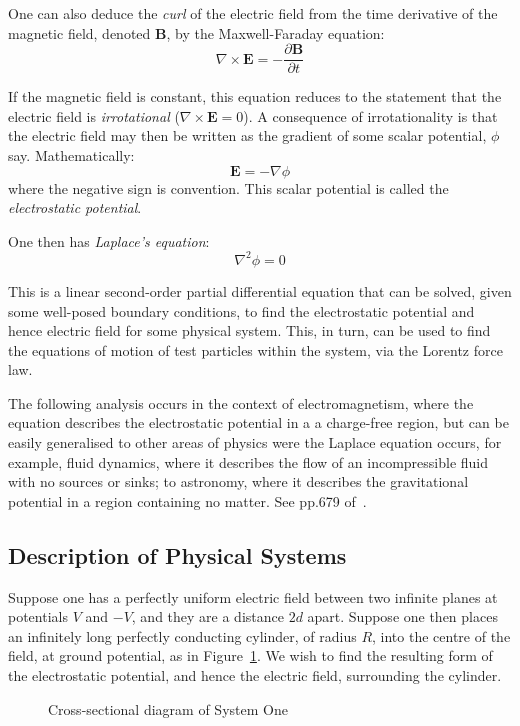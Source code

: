 \documentclass[11pt, a4paper]{article}
\newcommand{\be}{\begin{equation}}
\newcommand{\ee}{\end{equation}}
\begin{document}
One can also deduce the \emph{curl} of the electric field from the time
derivative of the magnetic field, denoted \textbf{B}, by the Maxwell-Faraday equation:
%
\be
\nabla \times \bm{E} = - \frac{\partial \bm{B}}{\partial t}
\ee

If the magnetic field is constant, this equation reduces to the statement that
the electric field is \emph{irrotational} ($\nabla \times \bm{E}=0$). A
consequence of irrotationality is that the electric field may then be written as
the gradient of some scalar potential, $\phi$ say. Mathematically:
%
\be
\bm{E} = -\nabla \phi
\ee
%
where the negative sign is convention. This scalar potential is called the
\emph{electrostatic potential}.

One then has \emph{Laplace's equation}:
%
\be
\nabla^2 \phi = 0
\ee

This is a linear second-order partial differential equation that can be solved, given
some well-posed boundary conditions, to find the electrostatic potential and hence
electric field for some physical system. This, in turn, can be used to find the
equations of motion of test particles within the system, via the Lorentz force law.

The following analysis occurs in the context of electromagnetism, where the equation
describes the electrostatic potential in a a charge-free region, but can be easily
generalised to other areas of physics were the Laplace equation occurs, for example,
fluid dynamics, where it describes the flow of an incompressible fluid with no sources
or sinks; to astronomy, where it describes the gravitational potential in a region
containing no matter. See pp.679 of~\cite{mm}.

\subsection{Description of Physical Systems}

Suppose one has a perfectly uniform electric field between two infinite planes
at potentials $V$ and $-V$, and they are a distance $2d$ apart. Suppose one then
places an infinitely long perfectly conducting cylinder, of radius $R$, into the centre
of the field, at ground potential, as in Figure~\ref{fig:sys one}. We wish to find the
resulting form of the electrostatic potential, and hence the electric field, surrounding
the cylinder.

\begin{figure}[h!]
\begin{center}
\end{center}
\caption{Cross-sectional diagram of System One}
\label{fig:sys one}
\end{figure}
\end{document}
